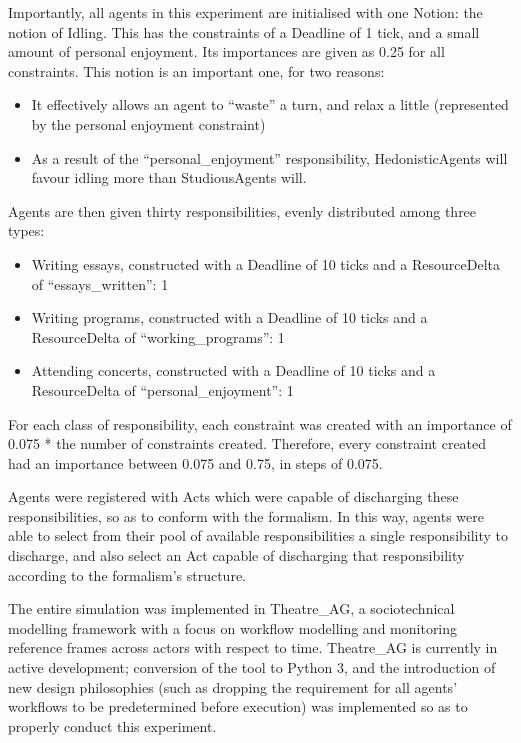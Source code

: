 Importantly, all agents in this experiment are initialised with one Notion: the notion of Idling. This has the constraints of a Deadline of 1 tick, and a small amount of personal enjoyment. Its importances are given as 0.25 for all constraints. This notion is an important one, for two reasons:

\begin{itemize}
    \item It effectively allows an agent to ``waste'' a turn, and relax a little (represented by the personal enjoyment constraint)
    \item As a result of the ``personal\_enjoyment'' responsibility, HedonisticAgents will favour idling more than StudiousAgents will.
\end{itemize}

Agents are then given thirty responsibilities, evenly distributed among three types:

\begin{itemize}
    \item Writing essays, constructed with a Deadline of 10 ticks and a ResourceDelta of ``essays\_written'': 1
    \item Writing programs, constructed with a Deadline of 10 ticks and a ResourceDelta of ``working\_programs'': 1
    \item Attending concerts, constructed with a Deadline of 10 ticks and a ResourceDelta of ``personal\_enjoyment'': 1
\end{itemize}

For each class of responsibility, each constraint was created with an importance of 0.075 * the number of constraints created. Therefore, every constraint created had an importance between 0.075 and 0.75, in steps of 0.075.\par

Agents were registered with Acts which were capable of discharging these responsibilities, so as to conform with the formalism. In this way, agents were able to select from their pool of available responsibilities a single responsibility to discharge, and also select an Act capable of discharging that responsibility according to the formalism's structure.\par

The entire simulation was implemented in Theatre\_AG\cite{theatre_code}, a sociotechnical modelling framework with a focus on workflow modelling and monitoring reference frames across actors with respect to time. Theatre\_AG is currently in active development; conversion of the tool to Python 3, and the introduction of new design philosophies (such as dropping the requirement for all agents' workflows to be predetermined before execution) was implemented so as to properly conduct this experiment.\par

